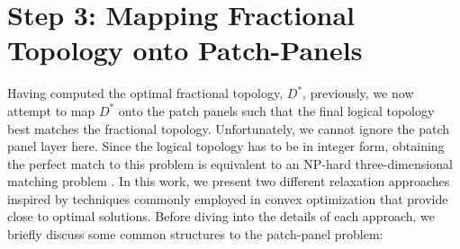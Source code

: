 \documentclass[sigconf]{acmart}
\theoremstyle{definition}
\begin{document}

\section{Step 3: Mapping Fractional Topology onto Patch-Panels}\label{section_patch_panel_mapping}
Having computed the optimal fractional topology, $D^*$, previously, we now attempt to map $D^*$ onto the patch panels such that the final logical topology best matches the fractional topology. Unfortunately, we cannot ignore the patch panel layer here. Since the logical topology has to be in integer form, obtaining the perfect match to this problem is equivalent to an NP-hard three-dimensional matching problem \cite{irving1994three, foerster2018characterizing}. In this work, we present two different relaxation approaches inspired by techniques commonly employed in convex optimization that provide close to optimal solutions. Before diving into the details of each approach, we briefly discuss some common structures to the patch-panel problem:
\end{document}
